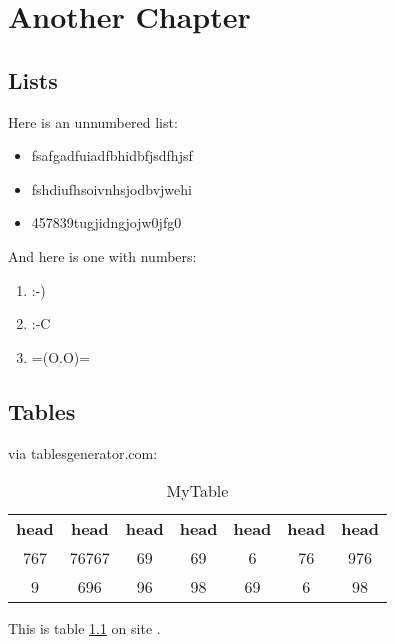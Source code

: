 \chapter{Another Chapter}

\section{Lists}
    
Here is an unnumbered list:
        
\begin{itemize}
    \item fsafgadfuiadfbhidbfjsdfhjsf
    \item fshdiufhsoivnhsjodbvjwehi
    \item 457839tugjidngjojw0jfg0
\end{itemize}
        
\noindent And here is one with numbers:
        
\begin{enumerate}
    \item :-)
    \item :-C 
    \item =(O.O)=
\end{enumerate}

\section{Tables}

via tablesgenerator.com: 
        
\begin{table}[h]
    \centering
    \begin{tabular}{ccccccc}
        \rowcolor[HTML]{FFCE93} 
        \textbf{head} & \textbf{head} & \textbf{head} & \textbf{head} & \textbf{head} & \textbf{head} & \textbf{head} \\
        \rowcolor[HTML]{C4C1C1} 
        767           & 76767         & 69            & 69            & 6             & 76            & 976           \\
        \rowcolor[HTML]{C4C1C1} 
            9             & 696           & 96            & 98            & 69            & 6             & 98           
        \end{tabular}
        \caption{\label{table} MyTable}
\end{table}

\noindent This is table \ref{table} on site \pageref{table}.